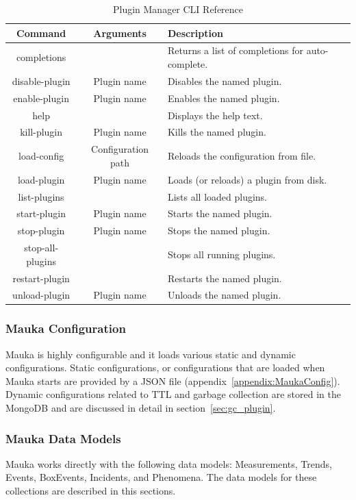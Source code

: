 \begin{table}[H]
	\centering
	\caption{Plugin Manager CLI Reference}
	\begin{tabular}{|c|c|p{8cm}|}
		\hline
		Command & Arguments & Description \\
		\hline
		completions & & Returns a list of completions for auto-complete. \\
		\hline
		disable-plugin & Plugin name & Disables the named plugin. \\
		\hline
		enable-plugin & Plugin name & Enables the named plugin. \\
		\hline
		help & & Displays the help text. \\
		\hline
		kill-plugin & Plugin name & Kills the named plugin. \\
		\hline
		load-config & Configuration path & Reloads the configuration from file. \\
		\hline
		load-plugin & Plugin name & Loads (or reloads) a plugin from disk. \\
		\hline
		list-plugins & & Lists all loaded plugins. \\
		\hline
		start-plugin & Plugin name & Starts the named plugin. \\
		\hline
		stop-plugin & Plugin name & Stops the named plugin. \\
		\hline
		stop-all-plugins & & Stops all running plugins. \\
		\hline
		restart-plugin & & Restarts the named plugin. \\
		\hline
		unload-plugin & Plugin name & Unloads the named plugin. \\
		\hline
	\end{tabular}
	\label{table:PluginManager}
\end{table}

\subsubsection{Mauka Configuration}
Mauka is highly configurable and it loads various static and dynamic configurations. Static configurations, or configurations that are loaded when Mauka starts are provided by a JSON file (appendix~\ref{appendix:MaukaConfig}). Dynamic configurations related to TTL and garbage collection are stored in the MongoDB and are discussed in detail in section~\ref{sec:gc_plugin}.

\subsubsection{Mauka Data Models}
Mauka works directly with the following data models: Measurements, Trends, Events, BoxEvents, Incidents, and Phenomena. The data models for these collections are described in this sections.

